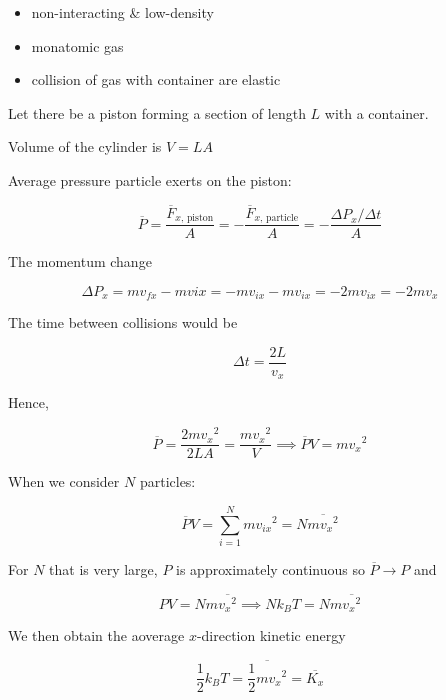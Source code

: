 \begin{itemize}
	\item non-interacting \& low-density
	\item monatomic gas
	\item collision of gas with container are elastic
\end{itemize}

Let there be a piston forming a section of length $L$ with a container.

Volume of the cylinder is $V = LA$

Average pressure particle exerts on the piston:

\begin{equation}
	\overline{P} = \frac{\overline{F}_{x\text{, piston}}}{A} = -\frac{\overline{F}_{x\text{, particle}}}{A} = - \frac{\Delta P_x / \Delta t}{A}
\end{equation}

The momentum change

\begin{equation}
	\Delta P_x = mv_{fx} - mv{ix} = - mv_{ix} - mv_{ix} = -2 mv_{ix} = -2mv_x
\end{equation}

The time between collisions would be

\begin{equation}
	\Delta t = \frac{2L}{v_x}
\end{equation}

Hence,

\begin{equation}
	\overline{P} = \frac{2m{v_x}^2}{2LA} = \frac{m{v_x}^2}{V} \implies \overline{P}V = m{v_x}^2
\end{equation}

When we consider $N$ particles:

\begin{equation}
	\overline{P}V = \sum_{i=1}^N m{v_{ix}}^2 = N \overline{m{v_x}^2}
\end{equation}

For $N$ that is very large, $P$ is approximately continuous so $\overline{P} \to P$ and

\begin{equation}
	PV = Nm \overline{{v_x}^2} \implies Nk_BT = N m \overline{{v_x}^2}
\end{equation}

We then obtain the aoverage $x$-direction kinetic energy

\begin{equation}
	\frac{1}{2}k_B T = \overline{\frac{1}{2}m{v_x}^2} = \overline{K_x}
\end{equation}

